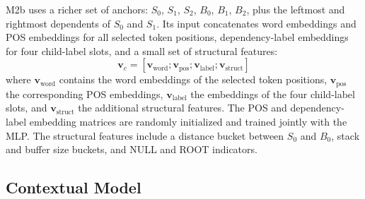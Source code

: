 \documentclass[12pt,letterpaper]{article}
\begin{document}
M2b uses a richer set of anchors: $S_0$, $S_1$, $S_2$, $B_0$, $B_1$, $B_2$, plus the leftmost and rightmost dependents of $S_0$ and $S_1$. Its input concatenates word embeddings and POS embeddings for all selected token positions, dependency-label embeddings for four child-label slots, and a small set of structural features:
\begin{equation}
\mathbf{v}_c =
\left[
\mathbf{v}_{\text{word}};
\mathbf{v}_{\text{pos}};
\mathbf{v}_{\text{label}};
\mathbf{v}_{\text{struct}}
\right]
\end{equation}
where $\mathbf{v}_{\text{word}}$ contains the word embeddings of the selected token positions, $\mathbf{v}_{\text{pos}}$ the corresponding POS embeddings, $\mathbf{v}_{\text{label}}$ the embeddings of the four child-label slots, and $\mathbf{v}_{\text{struct}}$ the additional structural features. The POS and dependency-label embedding matrices are randomly initialized and trained jointly with the MLP. The structural features include a distance bucket between $S_0$ and $B_0$, stack and buffer size buckets, and NULL and ROOT indicators.
\subsection{Contextual Model}
\label{subsec:contextual_model}
\end{document}

